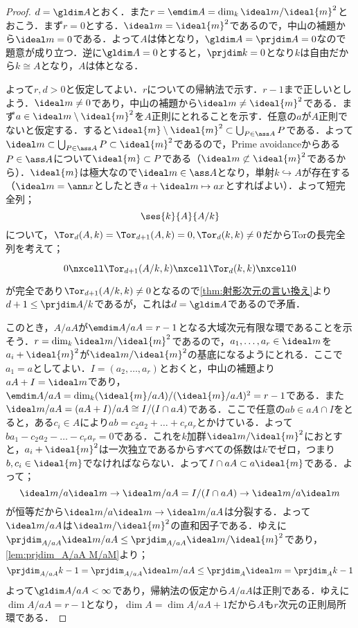 \begin{proof}
	$d=\gldim A$とおく．また$r=\emdim A=\dim_k\ideal m/\ideal{m}^2$とおこう．まず$r=0$とする．$\ideal m=\ideal{m}^2$であるので，中山の補題から$\ideal m=0$である．よって$A$は体となり，$\gldim A=\prjdim A=0$なので題意が成り立つ．逆に$\gldim A=0$とすると，$\prjdim k=0$となり$k$は自由だから$k\cong A$となり，$A$は体となる．
	
	よって$r,d>0$と仮定してよい．$r$についての帰納法で示す．$r-1$まで正しいとしよう．$\ideal m\neq0$であり，中山の補題から$\ideal m\neq\ideal{m}^2$である．まず$a\in\ideal m\setminus\ideal{m}^2$を$A$正則にとれることを示す．任意の$a$が$A$正則でないと仮定する．すると$\ideal{m}\setminus\ideal{m}^2\subset\bigcup_{P\in\ass A}P$である．よって$\ideal m\subset\bigcup_{P\in\ass A}P\subset\ideal{m}^2$であるので，Prime avoidanceからある$P\in\ass A$について$\ideal{m}\subset P$である（$\ideal m\not\subset\ideal{m}^2$であるから）．$\ideal{m}$は極大なので$\ideal m\in\ass A$となり，単射$k\hookrightarrow A$が存在する（$\ideal m=\ann x$としたとき$a+\ideal m\mapsto ax$とすればよい）．よって短完全列；
	\[\ses{k}{A}{A/k}\]
	について，$\Tor_d(A,k)=\Tor_{d+1}(A,k)=0,\Tor_d(k,k)\neq0$だからTorの長完全列を考えて；
	\[\begin{tikzcd}
		0\nxcell\Tor_{d+1}(A/k,k)\nxcell\Tor_d(k,k)\nxcell0
	\end{tikzcd}\]
	が完全であり$\Tor_{d+1}(A/k,k)\neq0$となるので\ref{thm:射影次元の言い換え}より$d+1\leq\prjdim A/k$であるが，これは$d=\gldim A$であるので矛盾．
	
	このとき，$A/aA$が$\emdim A/aA=r-1$となる大域次元有限な環であることを示そう．$r=\dim_k \ideal m/\ideal{m}^2$であるので，$a_1,\dots,a_r\in\ideal m$を$a_i+\ideal{m}^2$が$\ideal m/\ideal{m}^2$の基底になるようにとれる．ここで$a_1=a$としてよい．$I=(a_2,\dots,a_r)$とおくと，中山の補題より$aA+I=\ideal m$であり，$\emdim A/aA=\dim_k (\ideal{m}/aA)/(\ideal{m}/aA)^2=r-1$である．また$\ideal m/aA=(aA+I)/aA\cong I/(I\cap aA)$である．ここで任意の$ab\in aA\cap I$をとると，ある$c_i\in A$により$ab=c_2a_2+\dots+c_ra_r$とかけている．よって$ba_1-c_2a_2-\dots-c_ra_r=0$である．これを$k$加群$\ideal m/\ideal{m}^2$におとすと，$a_i+\ideal{m}^2$は一次独立であるからすべての係数は$k$でゼロ，つまり$b,c_i\in\ideal{m}$でなければならない．よって$I\cap aA\subset a\ideal{m}$である．よって；
	\[\ideal m/a\ideal m\to\ideal m/aA=I/(I\cap aA)\to\ideal m/a\ideal m\]
	が恒等だから$\ideal m/a\ideal m\to \ideal m/aA$は分裂する．よって$\ideal m/aA$は$\ideal m/\ideal{m}^2$の直和因子である．ゆえに$\prjdim_{A/aA}\ideal m/aA\leq\prjdim_{A/aA}\ideal m/\ideal{m}^2$であり，\ref{lem:prjdim_A/aA M/aM}より；
	\[\prjdim_{A/aA} k-1=\prjdim_{A/aA}\ideal m/aA\leq\prjdim_A \ideal m=\prjdim_A k-1\]
	よって$\gldim A/aA<\infty$であり，帰納法の仮定から$A/aA$は正則である．ゆえに$\dim A/aA=r-1$となり，$\dim A=\dim A/aA+1$だから$A$も$r$次元の正則局所環である．
\end{proof}

